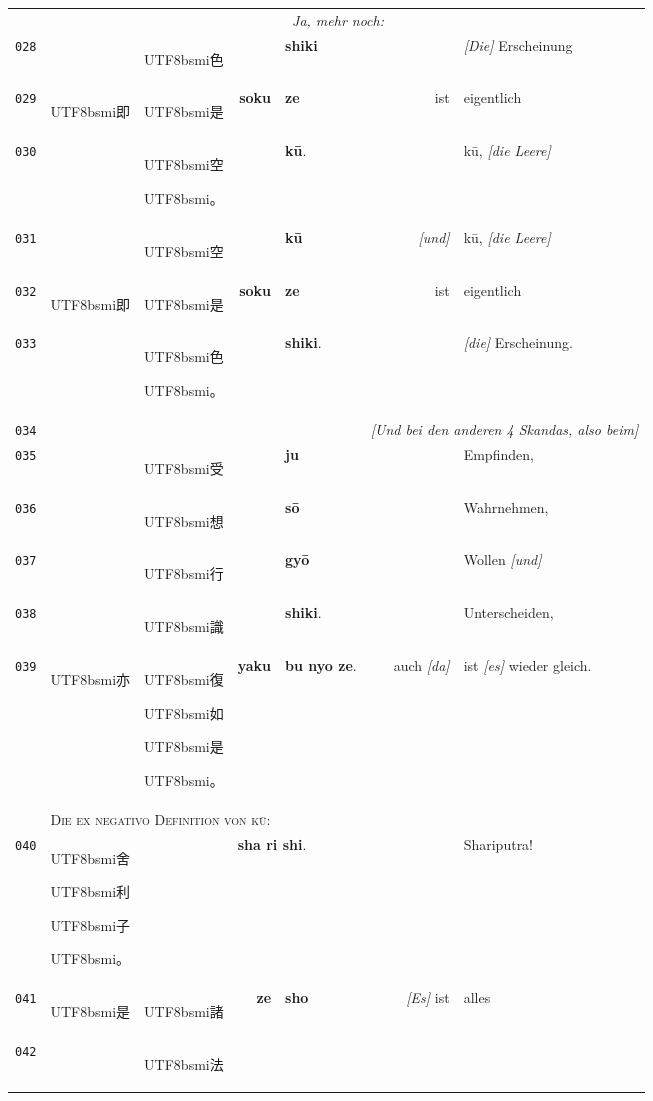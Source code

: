 \documentclass[
DIV=calc,
BCOR=5mm,
11pt,
headings=small,
oneside,
bibtotocnumbered]{scrartcl}
\newcommand{\cnbsmi}[1]{\begin{CJK}{UTF8}{bsmi}#1\end{CJK}}
\begin{document}
\begin{center}
\begin{tabular}{r|rl|rl|rl}
  ~ & ~ & ~ & ~ & \multicolumn{2}{l}{\textrm{~\emph{Ja, mehr noch:}}}  \\  
{\tiny\texttt{028}}&
  ~ & \cnbsmi{色} &
  ~ & \textbf{shiki} & 
  ~ & \textrm{\emph{[Die]} Erscheinung} \\  
{\tiny\texttt{029}}&
  \cnbsmi{即} & \cnbsmi{是} & 
  \textbf{soku} & \textbf{ze} &
  \textrm{ist} & \textrm{eigentlich} \\  
{\tiny\texttt{030}}&
  ~ & \cnbsmi{空} \cnbsmi{。} &
  ~ & \textbf{kū}. &
  ~ & \textrm{kū, \emph{[die Leere]}} \\
 \hdashline
 {\tiny\texttt{031}}&
  ~ & \cnbsmi{空} &
  ~ & \textbf{kū} & 
  \textrm{\emph{[und]}} & \textrm{kū, \emph{[die Leere]}} \\
{\tiny\texttt{032}}&
  \cnbsmi{即} & \cnbsmi{是} & 
  \textbf{soku} & \textbf{ze} &
  \textrm{ist} & \textrm{eigentlich} \\  
{\tiny\texttt{033}}&
 ~ & \cnbsmi{色} \cnbsmi{。} &
 ~ & \textbf{shiki}. &~
 ~ & \textrm{\emph{[die]} Erscheinung.} \\
 \hline
 {\tiny\texttt{034}}&
    ~ & ~ & ~ & ~ & \multicolumn{2}{l}{
    \textrm{\emph{[Und bei den anderen 4 Skandas, also beim]}}}\\
 {\tiny\texttt{035}}&
  ~ & \cnbsmi{受} &
  ~ & \textbf{ju} &
  ~ & \textrm{Empfinden,} \\
{\tiny\texttt{036}}&
  ~ & \cnbsmi{想} &
  ~ & \textbf{sō} &
  ~ & \textrm{Wahrnehmen,} \\
 {\tiny\texttt{037}}&
  ~ & \cnbsmi{行} &
  ~ & \textbf{gyō} &
  ~ & \textrm{Wollen \emph{[und]}} \\
 {\tiny\texttt{038}}&
  ~ & \cnbsmi{識} &
  ~ & \textbf{shiki}. &
  ~ & \textrm{Unterscheiden}, \\
{\tiny\texttt{039}}&
  \cnbsmi{亦} & \cnbsmi{復} \cnbsmi{如} \cnbsmi{是} \cnbsmi{。} &
  \textbf{yaku} & \textbf{bu nyo ze}. &
  \textrm{auch \emph{[da]}} & \textrm{ist \emph{[es]} wieder gleich}. \\
\hline
  ~ & \multicolumn{6}{l}{\textsc{Die ex negativo Definition von \textrm{kū}:}}\\
\hline
{\tiny\texttt{040}} &
  \multicolumn{2}{l|}{\cnbsmi{舍} \cnbsmi{利} \cnbsmi{子} \cnbsmi{。}} &
  \multicolumn{2}{l|}{\textbf{sha ri shi}.} &
  ~ & \textrm{Shariputra!}\\
\hline
{\tiny\texttt{041}}&
  \cnbsmi{是} & \cnbsmi{諸} &
  \textbf{ze} & \textbf{sho} &
  \textrm{\emph{[Es]} ist} & \textrm{alles} \\
{\tiny\texttt{042}}&
  ~ & \cnbsmi{法} &

\end{tabular}
\end{center}
\end{document}
